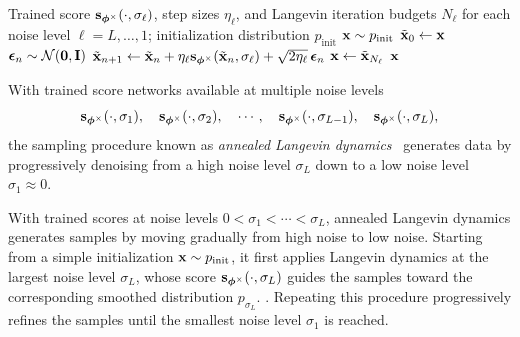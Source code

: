 \begin{algorithm}[th]
\caption{\label{alg:smld} Annealed Langevin Dynamics}
\begin{algorithmic}[1]
\Require Trained score ${\mathbf{s}}_{\bm{\phi}^\times}(\cdot,\sigma_\ell)$,
step sizes $\eta_\ell$, and Langevin iteration budgets $N_\ell$
for each noise level $\ell=L,\ldots,1$; initialization distribution
$p_{\mathrm{init}}$
\State ${\mathbf{x}} \sim p_{\mathrm{init}}$
\Statex{}
    \State $\tilde{{\mathbf{x}}}_0 \gets {\mathbf{x}}$
    \Statex{}
        \State $\bm{\epsilon}_n \sim \mathcal{N}(\bm{0},{\mathbf{I}})$
        \State $\tilde{{\mathbf{x}}}_{n+1}
        \gets
        \tilde{{\mathbf{x}}}_n
        +\eta_\ell
        {\mathbf{s}}_{\bm{\phi}^\times}(\tilde{{\mathbf{x}}}_n,\sigma_\ell)
        +\sqrt{2\eta_\ell}\,\bm{\epsilon}_n$
    \EndFor
    \State ${\mathbf{x}} \gets \tilde{{\mathbf{x}}}_{N_\ell}$
    \Statex{}
\EndFor
\Ensure ${\mathbf{x}}$
\end{algorithmic}
\end{algorithm}


With trained score networks available at multiple noise levels
\[
{\mathbf{s}}_{\bm{\phi}^\times}(\cdot, \sigma_1), \quad{\mathbf{s}}_{\bm{\phi}^\times}(\cdot, \sigma_2), \quad \cdots, \quad {\mathbf{s}}_{\bm{\phi}^\times}(\cdot, \sigma_{L-1}), \quad    {\mathbf{s}}_{\bm{\phi}^\times}(\cdot, \sigma_L),
\]
the sampling procedure known as \emph{annealed Langevin dynamics}~\citep{song2019generative} generates data by progressively denoising from a high noise level $\sigma_L$ down to a low noise level $\sigma_1 \approx 0$.

With trained scores at noise levels
$0<\sigma_1<\cdots<\sigma_L$, annealed Langevin dynamics generates samples by
moving gradually from high noise to low noise.
Starting from a simple initialization
${\mathbf{x}}\sim p_{\mathrm{init}}$, it first applies Langevin dynamics at the largest
noise level $\sigma_L$, whose score
${\mathbf{s}}_{\bm{\phi}^\times}(\cdot,\sigma_L)$ guides the samples toward the
corresponding smoothed distribution $p_{\sigma_L}$.
. Repeating this procedure progressively refines the samples
until the smallest noise level $\sigma_1$ is reached.

